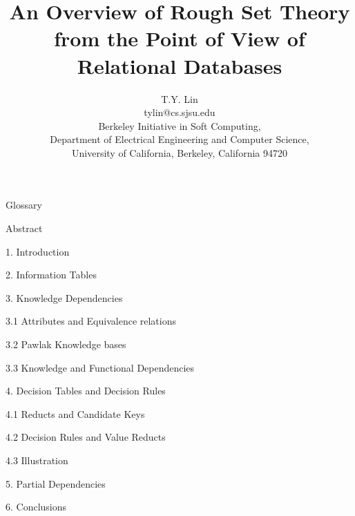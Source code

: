 \documentclass[12pt]{article}
\begin{document}

\title{An Overview of Rough Set Theory from the Point of View of
Relational Databases}
\author{T.Y. Lin\\
tylin@cs.sjsu.edu\\
Berkeley Initiative in Soft Computing,\\
Department of Electrical Engineering and Computer Science,\\
University of California, Berkeley, California 94720}
\date{}

\maketitle

\begin{description}
\item Glossary
\item Abstract 
\item 1. Introduction
\item 2. Information Tables
\item 3. Knowledge Dependencies
\item 3.1 Attributes and Equivalence relations
\item 3.2 Pawlak Knowledge bases
\item 3.3 Knowledge and Functional Dependencies
\item 4. Decision Tables and Decision Rules
\item 4.1 Reducts and Candidate Keys
\item 4.2 Decision Rules and Value Reducts
\item 4.3 Illustration
\item 5. Partial Dependencies
\item 6. Conclusions
\end{description}
\newpage
\end{document}
